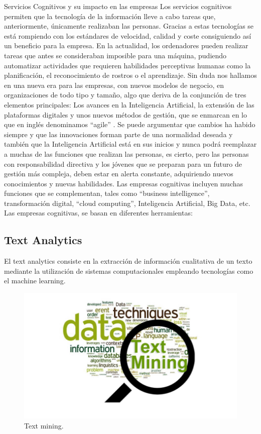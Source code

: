 Servicios Cognitivos y su impacto en las empresas
Los servicios cognitivos permiten que la tecnología de la información lleve a cabo tareas que, anteriormente, únicamente realizaban las personas. Gracias a estas tecnologías se está rompiendo con los estándares de velocidad, calidad y coste consiguiendo así un beneficio para la empresa.
En la actualidad, los ordenadores pueden realizar tareas que antes se consideraban imposible para una máquina, pudiendo automatizar actividades que requieren habilidades perceptivas humanas como la planificación, el reconocimiento de rostros o el aprendizaje. 
Sin duda nos hallamos en una nueva era para las empresas, con nuevos modelos de negocio, en organizaciones de todo tipo y tamaño, algo que deriva de la conjunción de tres elementos principales: Los avances en la Inteligencia Artificial, la extensión de las plataformas digitales y unos nuevos métodos de gestión, que se enmarcan en lo que en inglés denominamos “agile” \cite{JSolanao2019}.
Se puede argumentar que cambios ha habido siempre y que las innovaciones forman parte de una normalidad deseada y también que la Inteligencia Artificial está en sus inicios y nunca podrá reemplazar a muchas de las funciones que realizan las personas, es cierto, pero las personas con responsabilidad directiva y los jóvenes que se preparan para un futuro de gestión más compleja, deben estar en alerta constante, adquiriendo nuevos conocimientos y nuevas habilidades.
Las empresas cognitivas incluyen muchas funciones que se complementan, tales como “business intelligence”, transformación digital, “cloud computing”, Inteligencia Artificial, Big Data, etc.
Las empresas cognitivas, se basan en diferentes herramientas:

\subsection{Text Analytics}

El text analytics consiste en la extracción de información cualitativa de un texto mediante la utilización de sistemas computacionales empleando tecnologías como el machine learning.

\begin{figure}[htbp]
\centerline{\includegraphics[width = 0.5 \textwidth]{fig31.jpg}}
\caption{Text mining.}
\label{fig31}
\end{figure}


